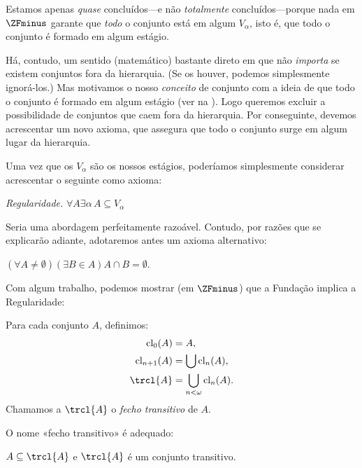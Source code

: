 \documentclass[../../../include/open-logic-section]{subfiles}
\begin{document}


Estamos apenas \emph{quase} concluídos---e não \emph{totalmente} concluídos---porque nada em
$\ZFminus$ garante que \emph{todo} o conjunto está em algum $V_\alpha$,
isto é, que todo o conjunto é formado em algum estágio. 

Há, contudo, um sentido (matemático) bastante direto em que não
\emph{importa} se existem conjuntos fora da hierarquia. (Se os houver,
podemos simplesmente ignorá-los.) Mas motivamos o nosso \emph{conceito} de conjunto com a ideia de que todo o conjunto é formado em
algum estágio (ver \stageshier{} na ). Logo
queremos excluir a possibilidade de conjuntos que caem fora da
hierarquia. Por conseguinte, devemos acrescentar um novo axioma, que assegura
que todo o conjunto surge em algum lugar da hierarquia. 

Uma vez que os $V_\alpha$ são os nossos estágios, poderíamos simplesmente considerar acrescentar o seguinte como axioma:

\begin{defish}
\emph{Regularidade.} $\forall A \exists \alpha\, A \subseteq V_\alpha$
\end{defish}

Seria uma abordagem perfeitamente razoável. Contudo, por razões
que se explicarão adiante, adotaremos antes um axioma alternativo:

\begin{axiom}[Fundação]
$(\forall A \neq \emptyset)(\exists B \in A)A \cap B = \emptyset$.
\end{axiom}

Com algum trabalho, podemos mostrar (em $\ZFminus$) que a Fundação implica a Regularidade:
\begin{defn}
Para cada conjunto $A$, definimos:
\begin{align*}
	\text{cl}_0(A) &= A,\\
	\text{cl}_{n+1}(A) &= \bigcup \text{cl}_n(A),\\
	\trcl{A} &= \bigcup_{n < \omega} \text{cl}_{n}(A).
\end{align*}
Chamamos a $\trcl{A}$ o \emph{fecho transitivo} de $A$.
\end{defn}
\noindent
O nome «fecho transitivo» é adequado:
\begin{prop}
$A \subseteq \trcl{A}$ e $\trcl{A}$ é um conjunto transitivo. 
\end{prop}
\end{document}
